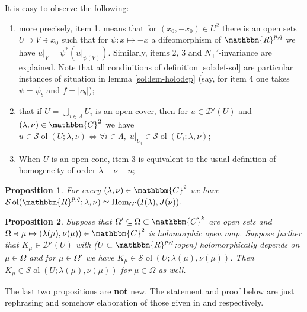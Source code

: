 \documentclass{article}
\newcommand{\tmop}[1]{\ensuremath{\operatorname{#1}}}
\newcommand{\tmtextbf}[1]{{\bfseries{#1}}}
\numberwithin{definition}{section}
\numberwithin{lemma}{section}
\newtheorem{proposition}{Proposition}
\numberwithin{proposition}{section}
{\theorembodyfont{\rmfamily}\newtheorem{remark}{Remark}
\numberwithin{remark}{section}
}
\begin{document}
\begin{remark}
  It is easy to observe the following:
  \begin{enumerate}
    \item more precisely, item 1. means that for $( x_0, - x_0) \in U^2$ there
    is an open sets $U \supset V \ni x_0$ such that for $\psi : x \mapsto - x$
    a difeomorphism of $\mathbbm{R}^{p, q}$ we have $u |_V = \psi^{\ast} ( u
    |_{\psi ( V)})$. Similarly, items 2, 3 and $N_+'$-invariance are
    explained. Note that all condinitions of definition \ref{sol:def-sol} are
    particular instances of situation in lemma \ref{sol:lem-holodep} (say, for
    item 4 one takes $\psi = \psi_b$ and $f = | c_b |$);
    
    \item that if $U = \bigcup_{i \in \Lambda} U_i$ is an open cover, then for
    $u \in \mathcal{D}' ( U)$ and $( \lambda, \nu) \in \mathbbm{C}^2$ we have
    $u \in \mathcal{S} \tmop{ol} ( U ; \lambda, \nu) \Leftrightarrow \forall i
    \in \Lambda, \; u |_{U_i} \in \mathcal{S} \tmop{ol} ( U_i ; \lambda,
    \nu)$;
    
    \item When $U$ is an open cone, item 3 is equivalent to the usual
    definition of homogeneity of order $\lambda - \nu - n$;
  \end{enumerate}
\end{remark}

\begin{proposition}
  \label{sol:prop-sol}For every $( \lambda, \nu) \in \mathbbm{C}^2$ we have
  $\mathcal{S} \tmop{ol} ( \mathbbm{R}^{p, q} ; \lambda, \nu) \simeq
  \tmop{Hom}_{G'} ( I ( \lambda), J ( \nu))$.
\end{proposition}

\begin{proposition}
  \label{sol:prop-holocont}Suppose that $\Omega' \subseteq \Omega \subset
  \mathbbm{C}^k$ are open sets and $\Omega \ni \mu \mapsto ( \lambda ( \mu),
  \nu ( \mu)) \in \mathbbm{C}^2$ is holomorphic open map. Suppose further that
  $K_{\mu} \in \mathcal{D}' ( U)$ with ($U \subset \mathbbm{R}^{p, q}$:open)
  holomorphically depends on $\mu \in \Omega$ and for $\mu \in \Omega'$ we
  have $K_{\mu} \in \mathcal{S} \tmop{ol} ( U ; \lambda ( \mu), \nu ( \mu))$.
  Then $K_{\mu} \in \mathcal{S} \tmop{ol} ( U ; \lambda ( \mu), \nu ( \mu))$
  for $\mu \in \Omega$ as well.
\end{proposition}

\begin{remark}
  The last two propositions are \tmtextbf{not} new. The statement and proof
  below are just rephrasing and somehow elaboration of those given in
  {\cite[thm 3.16]{kobayashi2015symmetry}} and {\cite[prop.
  3.18]{kobayashi2015symmetry}} respectively.
\end{remark}
\end{document}
